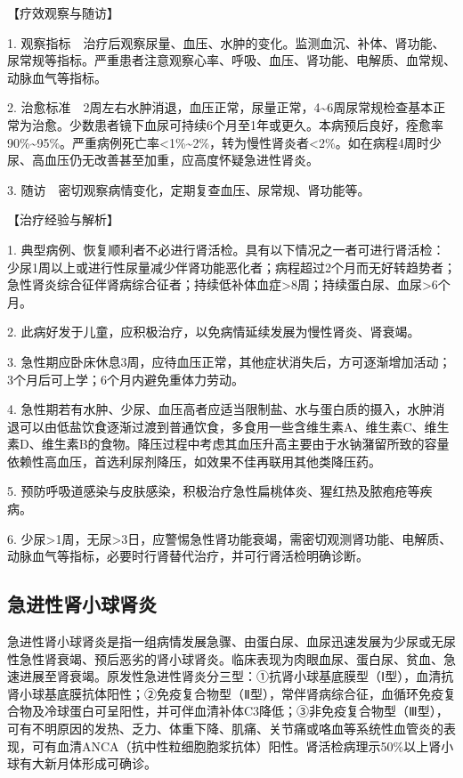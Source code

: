 【疗效观察与随访】

1.
观察指标　治疗后观察尿量、血压、水肿的变化。监测血沉、补体、肾功能、尿常规等指标。严重患者注意观察心率、呼吸、血压、肾功能、电解质、血常规、动脉血气等指标。

2.
治愈标准　2周左右水肿消退，血压正常，尿量正常，4\textasciitilde{}6周尿常规检查基本正常为治愈。少数患者镜下血尿可持续6个月至1年或更久。本病预后良好，痊愈率90\%\textasciitilde{}95\%。严重病例死亡率\textless{}1\%\textasciitilde{}2\%，转为慢性肾炎者\textless{}2\%。如在病程4周时少尿、高血压仍无改善甚至加重，应高度怀疑急进性肾炎。

3. 随访　密切观察病情变化，定期复查血压、尿常规、肾功能等。

【治疗经验与解析】

1.
典型病例、恢复顺利者不必进行肾活检。具有以下情况之一者可进行肾活检：少尿1周以上或进行性尿量减少伴肾功能恶化者；病程超过2个月而无好转趋势者；急性肾炎综合征伴肾病综合征者；持续低补体血症\textgreater{}8周；持续蛋白尿、血尿\textgreater{}6个月。

2. 此病好发于儿童，应积极治疗，以免病情延续发展为慢性肾炎、肾衰竭。

3.
急性期应卧床休息3周，应待血压正常，其他症状消失后，方可逐渐增加活动；3个月后可上学；6个月内避免重体力劳动。

4.
急性期若有水肿、少尿、血压高者应适当限制盐、水与蛋白质的摄入，水肿消退可以由低盐饮食逐渐过渡到普通饮食，多食用一些含维生素A、维生素C、维生素D、维生素B的食物。降压过程中考虑其血压升高主要由于水钠潴留所致的容量依赖性高血压，首选利尿剂降压，如效果不佳再联用其他类降压药。

5.
预防呼吸道感染与皮肤感染，积极治疗急性扁桃体炎、猩红热及脓疱疮等疾病。

6.
少尿\textgreater{}1周，无尿\textgreater{}3日，应警惕急性肾功能衰竭，需密切观测肾功能、电解质、动脉血气等指标，必要时行肾替代治疗，并可行肾活检明确诊断。

\subsection{急进性肾小球肾炎}

急进性肾小球肾炎是指一组病情发展急骤、由蛋白尿、血尿迅速发展为少尿或无尿性急性肾衰竭、预后恶劣的肾小球肾炎。临床表现为肉眼血尿、蛋白尿、贫血、急速进展至肾衰竭。原发性急进性肾炎分三型：①抗肾小球基底膜型（Ⅰ型），血清抗肾小球基底膜抗体阳性；②免疫复合物型（Ⅱ型），常伴肾病综合征，血循环免疫复合物及冷球蛋白可呈阳性，并可伴血清补体C3降低；③非免疫复合物型（Ⅲ型），可有不明原因的发热、乏力、体重下降、肌痛、关节痛或咯血等系统性血管炎的表现，可有血清ANCA（抗中性粒细胞胞浆抗体）阳性。肾活检病理示50\%以上肾小球有大新月体形成可确诊。

